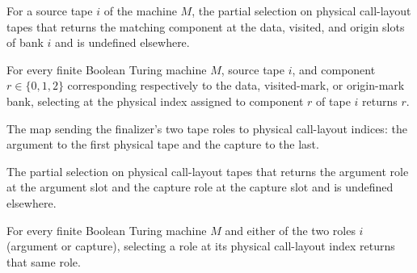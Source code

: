 \begin{definition}
\label{Turing.FinTM.emCallTripleSelect}
\leanok
{}
For a source tape $i$ of the machine $M$, the partial selection on physical call-layout
tapes that returns the matching component at the data, visited, and origin slots of bank
$i$ and is undefined elsewhere.
\end{definition}

\begin{lemma}
\label{Turing.FinTM.emCall_triple_inverse}
\leanok
{}
For every finite Boolean Turing machine $M$, source tape $i$, and component
$r\in\{0,1,2\}$ corresponding respectively to the data, visited-mark, or origin-mark
bank, selecting at the physical index assigned to component $r$ of tape $i$ returns $r$.
\end{lemma}

\begin{definition}
\label{Turing.FinTM.emCallPairIndex}
\leanok
{}
The map sending the finalizer's two tape roles to physical call-layout indices: the
argument to the first physical tape and the capture to the last.
\end{definition}

\begin{definition}
\label{Turing.FinTM.emCallPairSelect}
\leanok
{}
The partial selection on physical call-layout tapes that returns the argument role at
the argument slot and the capture role at the capture slot and is undefined elsewhere.
\end{definition}

\begin{lemma}
\label{Turing.FinTM.emCall_pair_inverse}
\leanok
{}
For every finite Boolean Turing machine $M$ and either of the two roles $i$ (argument or
capture), selecting a role at its physical call-layout index returns that same role.
\end{lemma}

